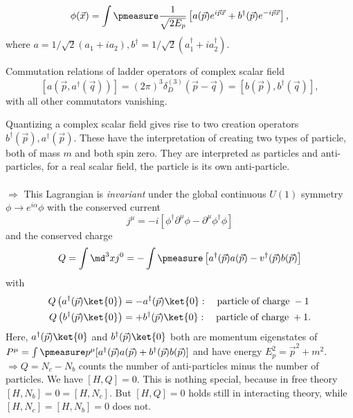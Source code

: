 \begin{equation}
	\phi(\vec{x})= \int  \pmeasure \frac{1}{\sqrt{2 E_p}} \left[a(\vec{p}) e^{i \vec{p} \vec{x}} + b^{\dagger}( \vec{p}) e^{- i \vec{p}\vec{x}} \right],
\end{equation}
where $a=1/\sqrt{2} (a_1 +i a_2), b^{\dagger}=1/\sqrt{2}(a^{\dagger}_1 + i a^{\dagger}_2)$.
\begin{mybox}{Commutation relations of ladder operators of complex scalar field}
	\begin{equation}
	\left[a(\vec{p}, a^{\dagger}(\vec{q}))\right]= (2 \pi)^3 \delta^{(3)}_D (\vec{p}-\vec{q}) = \left[b(\vec{p}), b^{\dagger}(\vec{q})\right],
	\end{equation}
	with all other commutators vanishing.
\end{mybox}
Quantizing a complex scalar field gives rise to two creation operators $b^{\dagger}(\vec{p}), a^{\dagger} (\vec{p})$. These have the interpretation of creating two types of particle, both of mass $m$ and both spin zero. They are interpreted as particles and anti-particles, for a real scalar field, the particle is its own anti-particle.\\
\\
$\Rightarrow$ This Lagrangian is \emph{invariant} under the global continuous $U(1)$ symmetry $\phi \rightarrow e^{i \alpha} \phi$ with the conserved current 
\begin{equation}
	j^{\mu} = -i \left[\phi^{\dagger} \partial^{\mu} \phi - \partial^{\mu} \phi^{\dagger} \phi\right]
\end{equation}
and the conserved charge
\begin{equation}
	Q = \int \md^3 x j^0 = - \int \pmeasure \left[a^{\dagger}(\vec{p}) a(\vec{p}) - v^{\dagger}(\vec{p}) b(\vec{p}) \right]
\end{equation}
with 
\begin{align}
	Q\left(a^{\dagger} (\vec{p}) \ket{0}\right) &= - a^{\dagger} (\vec{p}) \ket{0}: \quad \mathrm{particle \; of \; charge\; -1}\\
	Q\left(b^{\dagger} (\vec{p}) \ket{0}\right) &= + b^{\dagger} (\vec{p}) \ket{0}: \quad \mathrm{particle \; of \; charge\; +1}.
\end{align}
Here, $a^{\dagger}(\vec{p})\ket{0}$ and $b^{\dagger}(\vec{p})\ket{0}$ both are momentum eigenstates of $P^{\mu} = \int \pmeasure p^{\mu} [a^{\dagger}(\vec{p}) a(\vec{p}) + b^{\dagger}(\vec{p}) b(\vec{p}) ]$ and have energy $E^2_p = \vec{p}^2+m^2$.\\
$\Rightarrow Q=N_c - N_b$ counts the number of anti-particles minus the number of particles. We have $[H,Q]=0$. This is nothing special, because in free theory $[H,N_b]=0=[H,N_c]$. But $[H,Q]=0$ holds still in interacting theory, while $[H,N_c] = [H,N_b]=0$ does not.



